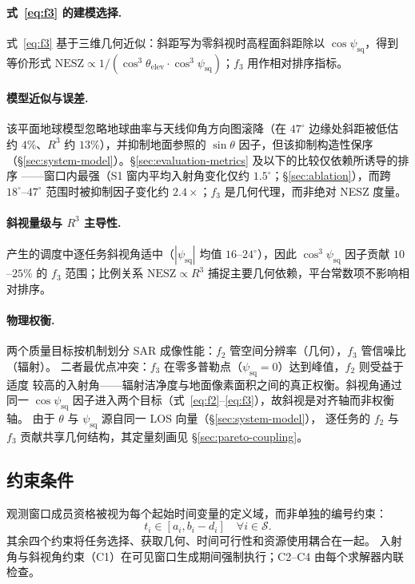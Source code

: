 \documentclass[preprint,12pt,authoryear]{elsarticle}
\begin{document}
\paragraph{式~\ref{eq:f3} 的建模选择.}
式~\ref{eq:f3} 基于三维几何近似：斜距写为零斜视时高程面斜距除以 $\cos\psi_{\text{sq}}$，得到等价形式
$\text{NESZ} \propto 1/(\cos^3\theta_{\text{elev}} \cdot \cos^3\psi_{\text{sq}})$；$f_3$ 用作相对排序指标。

\paragraph{模型近似与误差.}
该平面地球模型忽略地球曲率与天线仰角方向图滚降（在 $47^\circ$ 边缘处斜距被低估约
$4\%$、$R^3$ 约 $13\%$），并抑制地面参照的 $\sin\theta$ 因子，但该抑制构造性保序
（\S\ref{sec:system-model}）。\S\ref{sec:evaluation-metrics} 及以下的比较仅依赖所诱导的排序
——窗口内最强（S1 窗内平均入射角变化仅约 $1.5^\circ$；\S\ref{sec:ablation}），而跨
$18^\circ$--$47^\circ$ 范围时被抑制因子变化约 $2.4\times$；$f_3$ 是几何代理，而非绝对 NESZ 度量。

\paragraph{斜视量级与 $R^3$ 主导性.}
产生的调度中逐任务斜视角适中（$|\psi_{\text{sq}}|$ 均值 $16$--$24^\circ$），因此
$\cos^3\psi_{\text{sq}}$ 因子贡献 $10$--$25\%$ 的 $f_3$ 范围；比例关系
$\text{NESZ} \propto R^3$ 捕捉主要几何依赖，平台常数项不影响相对排序。
\paragraph{物理权衡.}
两个质量目标按机制划分 SAR 成像性能：$f_2$ 管空间分辨率（几何），$f_3$ 管信噪比（辐射）。
二者最优点冲突：$f_3$ 在零多普勒点（$\psi_{\text{sq}} = 0$）达到峰值，$f_2$ 则受益于适度
较高的入射角——辐射洁净度与地面像素面积之间的真正权衡。斜视角通过同一 $\cos\psi_{\text{sq}}$
因子进入两个目标（式~\ref{eq:f2}--\ref{eq:f3}），故斜视是对齐轴而非权衡轴。
由于 $\theta$ 与 $\psi_{\text{sq}}$ 源自同一 LOS 向量（\S\ref{sec:system-model}），
逐任务的 $f_2$ 与 $f_3$ 贡献共享几何结构，其定量刻画见 \S\ref{sec:pareto-coupling}。
\subsection{约束条件}\label{sec:constraints}
观测窗口成员资格被视为每个起始时间变量的定义域，而非单独的编号约束：
\begin{equation}
t_i \in [a_i, b_i - d_i] \quad \forall i \in \mathcal{S}.
\label{eq:observation-domain}
\end{equation}
其余四个约束将任务选择、获取几何、时间可行性和资源使用耦合在一起。
入射角与斜视角约束（C1）在可见窗口生成期间强制执行；C2--C4 由每个求解器内联检查。
\end{document}
